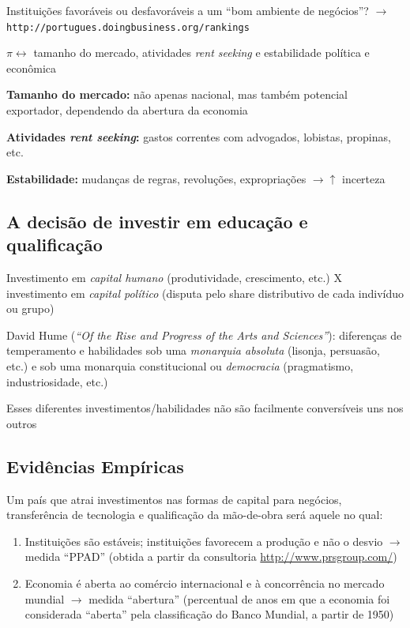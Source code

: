 \documentclass[a4paper,12pt]{article}[abntex2]
\begin{document}
Instituições favoráveis ou desfavoráveis a um “bom ambiente de negócios”? $\rightarrow$ \\
\texttt{http://portugues.doingbusiness.org/rankings}

$\pi \leftrightarrow$ tamanho do mercado, atividades \textit{rent seeking} e estabilidade política e econômica

\textbf{Tamanho do mercado:} não apenas nacional, mas também potencial exportador, dependendo da abertura da economia

\textbf{Atividades \textit{rent seeking}:} gastos correntes com advogados, lobistas, propinas, etc.

\textbf{Estabilidade:} mudanças de regras, revoluções, expropriações $\rightarrow \uparrow$ incerteza


\subsection{\textbf{A decisão de investir em educação e qualificação}}

Investimento em \textit{capital humano} (produtividade, crescimento, etc.) \quad X \quad investimento em \textit{capital político} (disputa pelo share distributivo de cada indivíduo ou grupo)

David Hume (\textit{“Of the Rise and Progress of the Arts and Sciences”}): diferenças de temperamento e habilidades sob uma \textit{monarquia absoluta} (lisonja, persuasão, etc.) e sob uma monarquia constitucional ou \textit{democracia} (pragmatismo, industriosidade, etc.)

Esses diferentes investimentos/habilidades não são facilmente conversíveis uns nos outros

\subsection{\textbf{Evidências Empíricas}}

Um país que atrai investimentos nas formas de capital para negócios, transferência de tecnologia e qualificação da mão-de-obra será aquele no qual:

\begin{enumerate}
    \item Instituições são estáveis; instituições favorecem a produção e não o desvio $\rightarrow$ medida ``PPAD'' (obtida a partir da consultoria \url{http://www.prsgroup.com/})

    \item Economia é aberta ao comércio internacional e à concorrência no mercado mundial $\rightarrow$ medida ``abertura'' (percentual de anos em que a economia foi considerada ``aberta'' pela classificação do Banco Mundial, a partir de 1950)
\end{enumerate}
\end{document}
